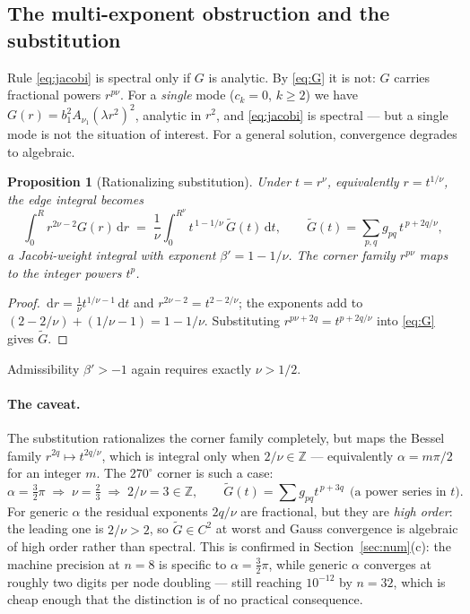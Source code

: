 \documentclass[11pt]{article}
\newtheorem{proposition}{Proposition}
\theoremstyle{remark}
\newcommand{\dd}{\,\mathrm{d}}
\begin{document}
\subsection{The multi-exponent obstruction and the substitution}\label{sec:sub}

Rule \eqref{eq:jacobi} is spectral only if $G$ is analytic. By \eqref{eq:G} it is
not: $G$ carries fractional powers $r^{p\nu}$. For a \emph{single} mode
($c_k=0$, $k\ge2$) we have $G(r)=b_1^2A_{\nu_1}(\lambda r^2)^2$, analytic in
$r^2$, and \eqref{eq:jacobi} is spectral --- but a single mode is not the
situation of interest. For a general solution, convergence degrades to algebraic.

\begin{proposition}[Rationalizing substitution]\label{prop:sub}
Under $t=r^{\nu}$, equivalently $r=t^{1/\nu}$, the edge integral becomes
\begin{equation}\label{eq:sub}
  \int_0^R r^{2\nu-2}G(r)\dd r
  \;=\;\frac1\nu\int_0^{R^\nu} t^{\,1-1/\nu}\,\widetilde G(t)\dd t,
  \qquad
  \widetilde G(t)=\sum_{p,q}g_{pq}\,t^{\,p+2q/\nu},
\end{equation}
a Jacobi-weight integral with exponent $\beta'=1-1/\nu$. The corner family
$r^{p\nu}$ maps to the integer powers $t^{p}$.
\end{proposition}
\begin{proof}
$\dd r=\frac1\nu t^{1/\nu-1}\dd t$ and $r^{2\nu-2}=t^{2-2/\nu}$; the exponents
add to $(2-2/\nu)+(1/\nu-1)=1-1/\nu$. Substituting $r^{p\nu+2q}=t^{p+2q/\nu}$
into \eqref{eq:G} gives $\widetilde G$.
\end{proof}

\noindent
Admissibility $\beta'>-1$ again requires exactly $\nu>1/2$.

\paragraph{The caveat.} The substitution rationalizes the corner family
completely, but maps the Bessel family $r^{2q}\mapsto t^{2q/\nu}$, which is
integral only when $2/\nu\in\mathbb{Z}$ --- equivalently $\alpha=m\pi/2$ for an
integer $m$. The $270^\circ$ corner is such a case:
\begin{equation}
  \alpha=\tfrac32\pi \;\Longrightarrow\; \nu=\tfrac23 \;\Longrightarrow\;
  2/\nu=3\in\mathbb{Z}, \qquad \widetilde G(t)=\sum g_{pq}t^{\,p+3q}
  \ \ \text{(a power series in $t$).}
\end{equation}
For generic $\alpha$ the residual exponents $2q/\nu$ are fractional, but they are
\emph{high order}: the leading one is $2/\nu>2$, so $\widetilde G\in C^{2}$ at
worst and Gauss convergence is algebraic of high order rather than spectral.
This is confirmed in Section~\ref{sec:num}(c): the machine precision at $n=8$
is specific to $\alpha=\frac32\pi$, while generic $\alpha$ converges at roughly
two digits per node doubling --- still reaching $10^{-12}$ by $n=32$, which is
cheap enough that the distinction is of no practical consequence.
\end{document}
